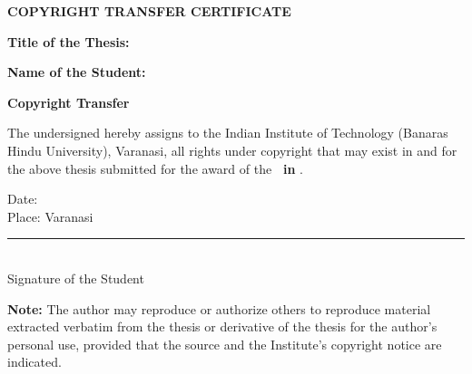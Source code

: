 {}
\thispagestyle{plain}
\begin{singlespace}

\vspace*{0.4cm}
\begin{center}
  {\large\bfseries COPYRIGHT TRANSFER CERTIFICATE}
\end{center}
\vspace{1.0cm}

\noindent
\textbf{Title of the Thesis:} \thesistitle

\vspace{0.5cm}
\noindent
\textbf{Name of the Student:} \thesisauthor

\vspace{1.0cm}
\begin{center}
  {\bfseries Copyright Transfer}
\end{center}
\vspace{0.4cm}

The undersigned hereby assigns to the Indian Institute of Technology
(Banaras Hindu University), Varanasi, all rights under copyright that may
exist in and for the above thesis submitted for the award of the
\textbf{\thesisdegree\ in \thesisdiscipline}.

\vspace{2.0cm}
\noindent
Date:\\[0.3cm]
Place: Varanasi
\hfill
\begin{minipage}{0.45\textwidth}
  \centering
  \rule{5cm}{0.4pt}\\
  Signature of the Student\\
  \textbf{\thesisauthor}
\end{minipage}

\vspace{1.5cm}
\noindent
\textbf{Note:} The author may reproduce or authorize others to reproduce
material extracted verbatim from the thesis or derivative of the thesis for
the author's personal use, provided that the source and the Institute's
copyright notice are indicated.

\end{singlespace}
\clearpage
